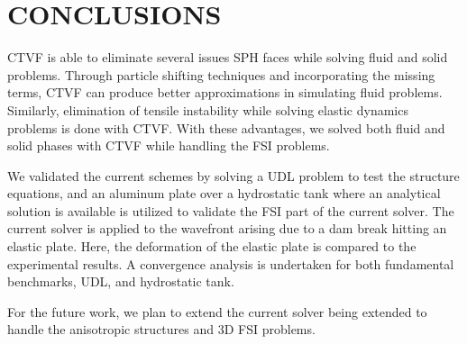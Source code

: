 \documentclass[10pt, conference]{FMFP2022}
\begin{document}
\section{\textbf{CONCLUSIONS}}\label{sec4}
CTVF is able to eliminate several issues SPH faces while solving fluid and solid
problems. Through particle shifting techniques and incorporating the missing
terms, CTVF can produce better approximations in simulating fluid problems.
Similarly, elimination of tensile instability while solving elastic dynamics
problems is done with CTVF. With these advantages, we solved both fluid and
solid phases with CTVF while handling the FSI problems.

We validated the current schemes by solving a UDL problem to test the structure
equations, and an aluminum plate over a hydrostatic tank where an analytical
solution is available is utilized to validate the FSI part of the current
solver. The current solver is applied to the wavefront arising due to a dam
break hitting an elastic plate. Here, the deformation of the elastic plate
is compared to the experimental results. A convergence analysis is undertaken
for both fundamental benchmarks, UDL, and hydrostatic tank.

For the future work, we plan to extend the current solver being extended to handle
the anisotropic structures and 3D FSI problems.
\end{document}
